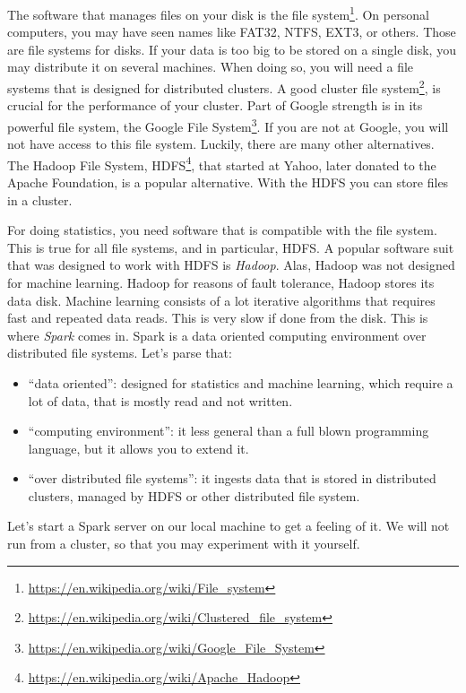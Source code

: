\documentclass[]{book}
\providecommand{\tightlist}{%
  \setlength{\itemsep}{0pt}\setlength{\parskip}{0pt}}
\renewcommand{\href}[2]{#2\footnote{\url{#1}}}
\theoremstyle{definition}
\theoremstyle{definition}
\theoremstyle{definition}
\theoremstyle{remark}
\begin{document}
The software that manages files on your disk is the \href{https://en.wikipedia.org/wiki/File_system}{file system}.
On personal computers, you may have seen names like FAT32, NTFS, EXT3, or others.
Those are file systems for disks.
If your data is too big to be stored on a single disk, you may distribute it on several machines.
When doing so, you will need a file systems that is designed for distributed clusters.
A good \href{https://en.wikipedia.org/wiki/Clustered_file_system}{cluster file system}, is crucial for the performance of your cluster.
Part of Google strength is in its powerful file system, the \href{https://en.wikipedia.org/wiki/Google_File_System}{Google File System}.
If you are not at Google, you will not have access to this file system.
Luckily, there are many other alternatives.
The Hadoop File System, \href{https://en.wikipedia.org/wiki/Apache_Hadoop}{HDFS}, that started at Yahoo, later donated to the Apache Foundation, is a popular alternative.
With the HDFS you can store files in a cluster.

For doing statistics, you need software that is compatible with the file system.
This is true for all file systems, and in particular, HDFS.
A popular software suit that was designed to work with HDFS is \emph{Hadoop}.
Alas, Hadoop was not designed for machine learning.
Hadoop for reasons of fault tolerance, Hadoop stores its data disk.
Machine learning consists of a lot iterative algorithms that requires fast and repeated data reads.
This is very slow if done from the disk.
This is where \emph{Spark} comes in.
Spark is a data oriented computing environment over distributed file systems.
Let's parse that:

\begin{itemize}
\tightlist
\item
  ``data oriented'': designed for statistics and machine learning, which require a lot of data, that is mostly read and not written.
\item
  ``computing environment'': it less general than a full blown programming language, but it allows you to extend it.
\item
  ``over distributed file systems'': it ingests data that is stored in distributed clusters, managed by HDFS or other distributed file system.
\end{itemize}

Let's start a Spark server on our local machine to get a feeling of it.
We will not run from a cluster, so that you may experiment with it yourself.
\end{document}
